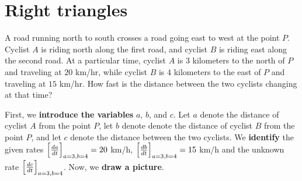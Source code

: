 \documentclass{ximera}
\begin{document}
\section{Right triangles}

\begin{example}
A road running north to south crosses a road going east to west at the
point $P$.  Cyclist $A$ is riding north along the first road, and
cyclist $B$ is riding east along the second road.  At a particular
time, cyclist $A$ is $3$ kilometers to the north of $P$ and traveling
at $20$ km/hr, while cyclist $B$ is $4$ kilometers to the east of $P$
and traveling at $15$ km/hr.  How fast is the distance between the two
cyclists changing at that time?


\begin{explanation}
First, we \textbf{introduce the variables} $a$, $b$, and $c$. Let $a$ denote the distance of cyclist $A$ from the point $P$, let $b$ denote denote the distance of cyclist $B$ from the point $P$, and  let $c$ denote the distance between the two cyclists. We \textbf{identify} the given rates $\Bigl[\frac{da}{dt}\Bigr]_{a=3, b=4}=20$ km/h, $\Bigl[\frac{db}{dt}\Bigr]_{a=3, b=4}=15$ km/h  and the unknown rate $\Bigl[\frac{dc}{dt}\Bigr]_{a=3, b=4}$. 
Now, we \textbf{draw a picture}.
\begin{image}
\end{image}
\end{explanation}
\end{example}
\end{document}

